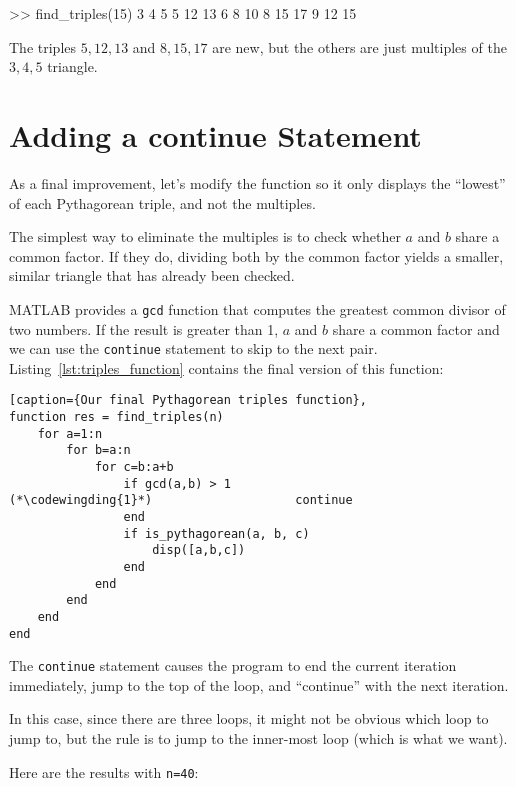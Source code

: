 \begin{code}
>> find_triples(15)
     3     4     5
     5    12    13
     6     8    10
     8    15    17
     9    12    15
\end{code}

The triples $5,12,13$ and $8,15,17$ are new, but the others are just multiples of the $3,4,5$ triangle.

\section{Adding a continue Statement}


As a final improvement, let's modify the function so it only
displays the ``lowest'' of each Pythagorean triple, and not the
multiples.

The simplest way to eliminate the multiples is to check whether
$a$ and $b$ share a common factor.  If they do, dividing both
by the common factor yields a smaller, similar triangle that has
already been checked.


MATLAB provides a {\tt gcd} function that computes the greatest common
divisor of two numbers.  If the result is greater than 1,
$a$ and $b$ share a common factor and we can use the {\tt continue}
statement to skip to the next pair. Listing~\ref{lst:triples_function} contains the final version of this function:

\begin{lstlisting}[caption={Our final Pythagorean triples function}, 
function res = find_triples(n)
    for a=1:n
        for b=a:n
            for c=b:a+b
                if gcd(a,b) > 1
(*\codewingding{1}*)	                continue
                end
                if is_pythagorean(a, b, c)
                    disp([a,b,c])
                end
            end
        end
    end
end
\end{lstlisting}

The {\tt continue} statement  causes the program to end the current iteration
immediately, jump to the top of the loop, and ``continue'' with the next iteration.

In this case, since there are three loops, it might not be obvious which loop to jump to, but the rule is to jump to the inner-most loop (which is what we want).

Here are the results with {\tt n=40}:

